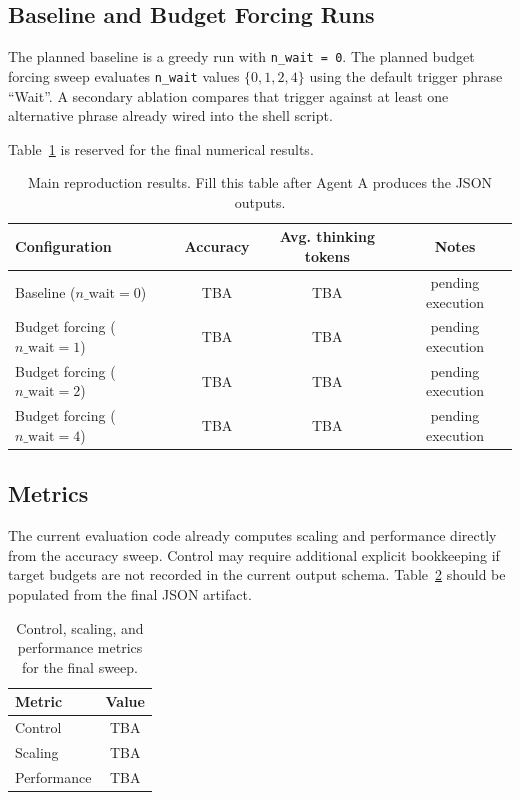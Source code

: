 \subsection{Baseline and Budget Forcing Runs}

The planned baseline is a greedy run with \texttt{n\_wait = 0}. The planned budget forcing sweep evaluates \texttt{n\_wait} values $\{0,1,2,4\}$ using the default trigger phrase ``Wait''. A secondary ablation compares that trigger against at least one alternative phrase already wired into the shell script.

Table~\ref{tab:main-results} is reserved for the final numerical results.

\begin{table}[H]
\centering
\caption{Main reproduction results. Fill this table after Agent A produces the JSON outputs.}
\label{tab:main-results}
\begin{tabular}{lccc}
\toprule
Configuration & Accuracy & Avg. thinking tokens & Notes \\
\midrule
Baseline ($n\_\text{wait}=0$) & TBA & TBA & pending execution \\
Budget forcing ($n\_\text{wait}=1$) & TBA & TBA & pending execution \\
Budget forcing ($n\_\text{wait}=2$) & TBA & TBA & pending execution \\
Budget forcing ($n\_\text{wait}=4$) & TBA & TBA & pending execution \\
\bottomrule
\end{tabular}
\end{table}

\subsection{Metrics}

The current evaluation code already computes scaling and performance directly from the accuracy sweep. Control may require additional explicit bookkeeping if target budgets are not recorded in the current output schema. Table~\ref{tab:metrics} should be populated from the final JSON artifact.

\begin{table}[H]
\centering
\caption{Control, scaling, and performance metrics for the final sweep.}
\label{tab:metrics}
\begin{tabular}{lc}
\toprule
Metric & Value \\
\midrule
Control & TBA \\
Scaling & TBA \\
Performance & TBA \\
\bottomrule
\end{tabular}
\end{table}

